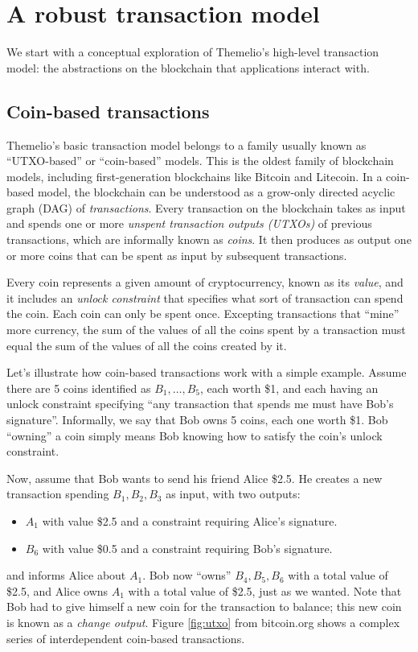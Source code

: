 \documentclass[headinclude,12pt]{scrbook}
\begin{document}
\section{A robust transaction model}

We start with a conceptual exploration of Themelio's high-level transaction model: the abstractions on the blockchain that applications interact with.

\subsection{Coin-based transactions}

Themelio's basic transaction model belongs to a family usually known as ``UTXO-based'' or ``coin-based'' models. This is the oldest family of blockchain models, including first-generation blockchains like Bitcoin and Litecoin. In a coin-based model, the blockchain can be understood as a grow-only directed acyclic graph (DAG) of \emph{transactions}. Every transaction on the blockchain takes as input and spends one or more \emph{unspent transaction outputs (UTXOs)} of previous transactions, which are informally known as \textit{coins}. It then produces as output one or more coins that can be spent as input by subsequent transactions.

Every coin represents a given amount of cryptocurrency, known as its \emph{value}, and it includes an \emph{unlock constraint} that specifies what sort of transaction can spend the coin. Each coin can only be spent once. Excepting transactions that ``mine'' more currency, the sum of the values of all the coins spent by a transaction must equal the sum of the values of all the coins created by it.

Let's illustrate how coin-based transactions work with a simple example. Assume there are 5 coins identified as $B_1,\dots,B_{5}$, each worth \$1, and each having an unlock constraint specifying ``any transaction that spends me must have Bob's signature''. Informally, we say that Bob owns 5 coins, each one worth \$1. Bob ``owning'' a coin simply means Bob knowing how to satisfy the coin's unlock constraint.

Now, assume that Bob wants to send his friend Alice \$2.5. He creates a new transaction spending $B_1,B_2,B_3$ as input, with two outputs:
\begin{itemize}
    \item $A_1$ with value \$2.5 and a constraint requiring Alice's signature.
    \item $B_6$ with value \$0.5 and a constraint requiring Bob's signature.
\end{itemize}
and informs Alice about $A_1$. Bob now ``owns'' $B_4,B_5,B_6$ with a total value of \$2.5, and Alice owns $A_1$ with a total value of \$2.5, just as we wanted. Note that Bob had to give himself a new coin for the transaction to balance; this new coin is known as a \emph{change output}. Figure \ref{fig:utxo} from bitcoin.org shows a complex series of interdependent coin-based transactions.
\end{document}
